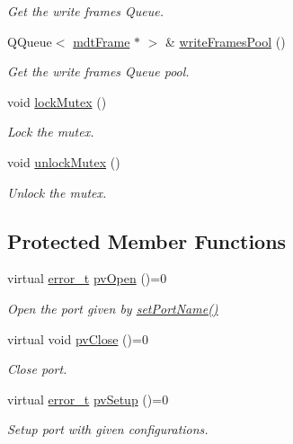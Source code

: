 \begin{DoxyCompactItemize}
\begin{DoxyCompactList}\small\item\em Get the write frames Queue. \end{DoxyCompactList}\item 
QQueue$<$ \hyperlink{classmdt_frame}{mdtFrame} $\ast$ $>$ \& \hyperlink{classmdt_abstract_port_abf093b67fddebffa4f3c52277b9a8cf7}{writeFramesPool} ()
\begin{DoxyCompactList}\small\item\em Get the write frames Queue pool. \end{DoxyCompactList}\item 
\hypertarget{classmdt_abstract_port_a6bf2ecdcf894da3929a22eb8793a9fe3}{
void \hyperlink{classmdt_abstract_port_a6bf2ecdcf894da3929a22eb8793a9fe3}{lockMutex} ()}
\label{classmdt_abstract_port_a6bf2ecdcf894da3929a22eb8793a9fe3}

\begin{DoxyCompactList}\small\item\em Lock the mutex. \end{DoxyCompactList}\item 
\hypertarget{classmdt_abstract_port_a3523c72a06e4d950338f91e56c286e84}{
void \hyperlink{classmdt_abstract_port_a3523c72a06e4d950338f91e56c286e84}{unlockMutex} ()}
\label{classmdt_abstract_port_a3523c72a06e4d950338f91e56c286e84}

\begin{DoxyCompactList}\small\item\em Unlock the mutex. \end{DoxyCompactList}\end{DoxyCompactItemize}
\subsection*{Protected Member Functions}
\begin{DoxyCompactItemize}
\item 
virtual \hyperlink{classmdt_abstract_port_ad4121bb930c95887e77f8bafa065a85e}{error\_\-t} \hyperlink{classmdt_abstract_port_ac1440ea9759cbbee9efc5ea22afcdb0a}{pvOpen} ()=0
\begin{DoxyCompactList}\small\item\em Open the port given by \hyperlink{classmdt_abstract_port_a0ca143d32fc677bac7c1cf0e04144932}{setPortName()} \end{DoxyCompactList}\item 
virtual void \hyperlink{classmdt_abstract_port_add29e91ccc4be62ab5c0dcb2a68ae8f0}{pvClose} ()=0
\begin{DoxyCompactList}\small\item\em Close port. \end{DoxyCompactList}\item 
virtual \hyperlink{classmdt_abstract_port_ad4121bb930c95887e77f8bafa065a85e}{error\_\-t} \hyperlink{classmdt_abstract_port_a880e5ae1699af102f9a80501bb6a0021}{pvSetup} ()=0
\begin{DoxyCompactList}\small\item\em Setup port with given configurations. \end{DoxyCompactList}\end{DoxyCompactItemize}
